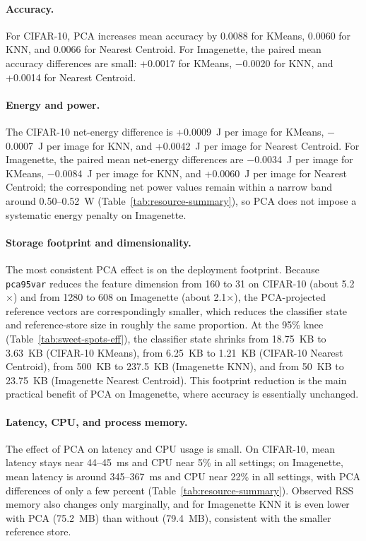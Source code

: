 \documentclass[sigconf,review]{acmart}
\begin{document}
\paragraph{Accuracy.}
For CIFAR-10, PCA increases mean accuracy by 0.0088 for KMeans, 0.0060 for KNN, and 0.0066 for Nearest Centroid.
For Imagenette, the paired mean accuracy differences are small: +0.0017 for KMeans, $-$0.0020 for KNN, and +0.0014 for Nearest Centroid.

\paragraph{Energy and power.}
The CIFAR-10 net-energy difference is +0.0009~J per image for KMeans, $-$0.0007~J per image for KNN, and +0.0042~J per image for Nearest Centroid.
For Imagenette, the paired mean net-energy differences are $-$0.0034~J per image for KMeans, $-$0.0084~J per image for KNN, and +0.0060~J per image for Nearest Centroid; the corresponding net power values remain within a narrow band around 0.50--0.52~W (Table~\ref{tab:resource-summary}), so PCA does not impose a systematic energy penalty on Imagenette.

\paragraph{Storage footprint and dimensionality.}
The most consistent PCA effect is on the deployment footprint.
Because \texttt{pca95var} reduces the feature dimension from 160 to 31 on CIFAR-10 (about 5.2$\times$) and from 1280 to 608 on Imagenette (about 2.1$\times$), the PCA-projected reference vectors are correspondingly smaller, which reduces the classifier state and reference-store size in roughly the same proportion.
At the 95\% knee (Table~\ref{tab:sweet-spots-eff}), the classifier state shrinks from 18.75~KB to 3.63~KB (CIFAR-10 KMeans), from 6.25~KB to 1.21~KB (CIFAR-10 Nearest Centroid), from 500~KB to 237.5~KB (Imagenette KNN), and from 50~KB to 23.75~KB (Imagenette Nearest Centroid).
This footprint reduction is the main practical benefit of PCA on Imagenette, where accuracy is essentially unchanged.

\paragraph{Latency, CPU, and process memory.}
The effect of PCA on latency and CPU usage is small.
On CIFAR-10, mean latency stays near 44--45~ms and CPU near 5\% in all settings; on Imagenette, mean latency is around 345--367~ms and CPU near 22\% in all settings, with PCA differences of only a few percent (Table~\ref{tab:resource-summary}).
Observed RSS memory also changes only marginally, and for Imagenette KNN it is even lower with PCA (75.2~MB) than without (79.4~MB), consistent with the smaller reference store.
\end{document}
